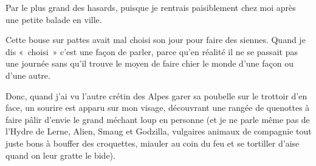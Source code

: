 Par le plus grand des hasards, puisque je rentrais paisiblement chez moi après une petite balade en ville.

Cette bouse sur pattes avait mal choisi son jour pour faire des siennes. Quand je dis «~choisi~» c’est une façon de parler, parce qu’en réalité il ne se passait pas une journée sans qu’il trouve le moyen de faire chier le monde d’une façon ou d’une autre.

Donc, quand j’ai vu l’autre crétin des Alpes garer sa poubelle sur le trottoir d’en face, un sourire est apparu sur mon visage, découvrant une rangée de quenottes à faire pâlir d’envie le grand méchant loup en personne (et je ne parle même pas de l’Hydre de Lerne, Alien, Smaug et Godzilla, vulgaires animaux de compagnie tout juste bons à bouffer des croquettes, miauler au coin du feu et se tortiller d’aise quand on leur gratte le bide).

